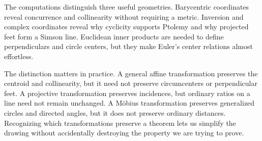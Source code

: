The computations distinguish three useful geometries. Barycentric coordinates reveal concurrence and collinearity without requiring a metric. Inversion and complex coordinates reveal why cyclicity supports Ptolemy and why projected feet form a Simson line. Euclidean inner products are needed to define perpendiculars and circle centers, but they make Euler's center relations almost effortless.

The distinction matters in practice. A general affine transformation preserves the centroid and collinearity, but it need not preserve circumcenters or perpendicular feet. A projective transformation preserves incidences, but ordinary ratios on a line need not remain unchanged. A Möbius transformation preserves generalized circles and directed angles, but it does not preserve ordinary distances. Recognizing which transformations preserve a theorem lets us simplify the drawing without accidentally destroying the property we are trying to prove.

